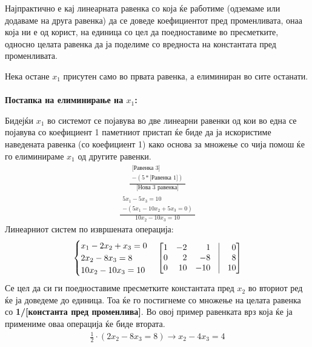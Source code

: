 \documentclass[12pt,a4paper]{article}
\begin{document}
	Најпрактично е кај линеарната равенка со која ќе работиме (одземаме или додаваме на друга равенка) да се доведе коефициентот пред променливата, онаа која ни е од корист, на единица со цел да поедноставиме во пресметките, односно целата равенка да ја поделиме со вредноста на константата пред променливата. 
	
	Нека остане $x_1$ присутен само во првата равенка, а елиминиран во сите останати.
	\\ \\
	\textbf{Постапка на елиминирање на $x_1$:}
	
	Бидејќи $x_1$ во системот се појавува во две линеарни равенки од кои во една се појавува со коефициент 1 паметниот пристап ќе биде да ја искористиме наведената равенка (со коефициент 1) како основа за множење со чија помош ќе го елиминираме $x_1$ од другите равенки.
	\begin{align}
		\frac{\begin{array}{c}
			\text{[Равенка 3]} \\
			-(5 * \text{[Равенка 1]})
		\end{array}}{
			\text{[Нова 3 равенка]}
	}
	\end{align}
	\begin{align}
		\frac{\begin{array}{c}
			5x_1 - 5x_3 = 10 \\
			-(5x_1 - 10x_2 + 5x_3 = 0)
		\end{array}}{
			10x_2 - 10x_3 = 10
	}
	\end{align}
	Линеарниот систем по извршената операција:
		\begin{align}
		\begin{cases}
			x_1 - 2x_2 + x_3 = 0 \\
			2x_2 - 8x_3 = 8 \\
			10x_2 - 10x_3 = 10
		\end{cases}
		\begin{bmatrix*}[r]
			1 & -2 & 1 & \vline & 0 \\
			0 & 2 & -8 & \vline & 8 \\
			0 & 10 & -10 & \vline & 10
		\end{bmatrix*}
	\end{align}
	Се цел да си ги поедноставиме пресметките константата пред $x_2$ во вториот ред ќе ја доведеме до единица. Тоа ќе го постигнеме со множење на целата равенка со \textbf{1/[константа пред променлива]}. Во овој пример равенката врз која ќе ја примениме оваа операција ќе биде втората.
	\begin{align}
		\frac{1}{2} \cdot (2x_2 - 8x_3 = 8) \to x_2 - 4x_3 = 4
	\end{align}
\end{document}
